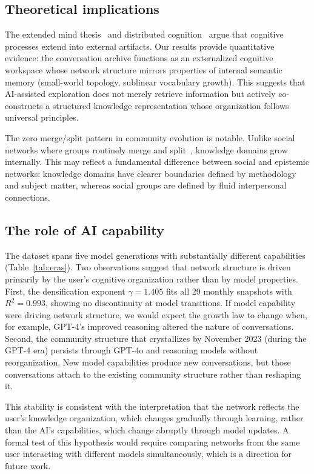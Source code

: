 \documentclass[journal]{IEEEtran}
\begin{document}
\subsection{Theoretical implications}

The extended mind thesis~\cite{clark1998extended} and distributed
cognition~\cite{hutchins1995cognition} argue that cognitive processes
extend into external artifacts.  Our results provide quantitative
evidence: the conversation archive functions as an externalized cognitive
workspace whose network structure mirrors properties of internal
semantic memory (small-world topology, sublinear vocabulary growth).
This suggests that AI-assisted exploration does not merely retrieve
information but actively co-constructs a structured knowledge
representation whose organization follows universal principles.

The zero merge/split pattern in community evolution is notable.
Unlike social networks where groups routinely merge and
split~\cite{palla2007quantifying}, knowledge domains grow internally.
This may reflect a fundamental difference between social and epistemic
networks: knowledge domains have clearer boundaries defined by
methodology and subject matter, whereas social groups are defined by
fluid interpersonal connections.

\subsection{The role of AI capability}

The dataset spans five model generations with substantially different
capabilities (Table~\ref{tab:eras}).  Two observations suggest that
network structure is driven primarily by the user's cognitive
organization rather than by model properties.  First, the densification
exponent $\gamma = 1.405$ fits all 29 monthly snapshots with
$R^2 = 0.993$, showing no discontinuity at model transitions.  If model
capability were driving network structure, we would expect the growth
law to change when, for example, GPT-4's improved reasoning altered the
nature of conversations.  Second, the community structure that
crystallizes by November 2023 (during the GPT-4 era) persists through
GPT-4o and reasoning models without reorganization.  New model
capabilities produce new conversations, but those conversations attach
to the existing community structure rather than reshaping it.

This stability is consistent with the interpretation that the network
reflects the user's knowledge organization, which changes gradually
through learning, rather than the AI's capabilities, which change
abruptly through model updates.  A formal test of this hypothesis
would require comparing networks from the same user interacting with
different models simultaneously, which is a direction for future work.
\end{document}
